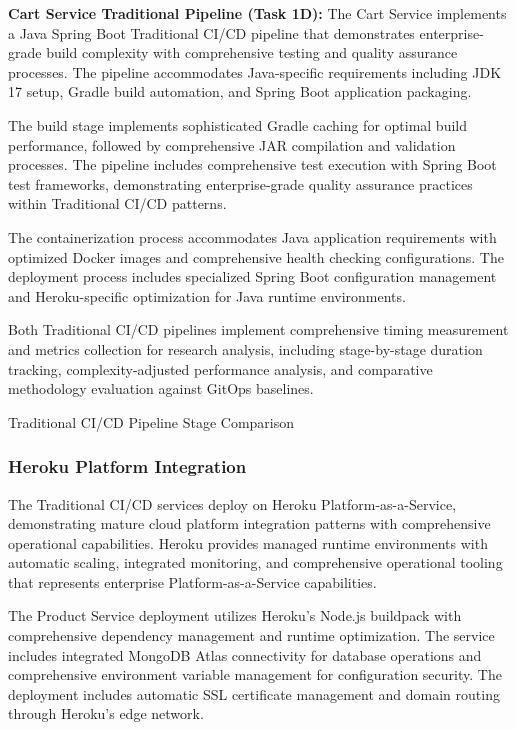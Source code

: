\textbf{Cart Service Traditional Pipeline (Task 1D):}
The Cart Service implements a Java Spring Boot Traditional CI/CD pipeline that demonstrates enterprise-grade build complexity with comprehensive testing and quality assurance processes. The pipeline accommodates Java-specific requirements including JDK 17 setup, Gradle build automation, and Spring Boot application packaging.

The build stage implements sophisticated Gradle caching for optimal build performance, followed by comprehensive JAR compilation and validation processes. The pipeline includes comprehensive test execution with Spring Boot test frameworks, demonstrating enterprise-grade quality assurance practices within Traditional CI/CD patterns.

The containerization process accommodates Java application requirements with optimized Docker images and comprehensive health checking configurations. The deployment process includes specialized Spring Boot configuration management and Heroku-specific optimization for Java runtime environments.

Both Traditional CI/CD pipelines implement comprehensive timing measurement and metrics collection for research analysis, including stage-by-stage duration tracking, complexity-adjusted performance analysis, and comparative methodology evaluation against GitOps baselines.

\begin{table}[H]
\centering
\caption{Traditional CI/CD Pipeline Stage Comparison}
\label{tab:traditional-pipeline-stages}
\end{table}

\subsubsection{Heroku Platform Integration}

The Traditional CI/CD services deploy on Heroku Platform-as-a-Service, demonstrating mature cloud platform integration patterns with comprehensive operational capabilities. Heroku provides managed runtime environments with automatic scaling, integrated monitoring, and comprehensive operational tooling that represents enterprise Platform-as-a-Service capabilities.

The Product Service deployment utilizes Heroku's Node.js buildpack with comprehensive dependency management and runtime optimization. The service includes integrated MongoDB Atlas connectivity for database operations and comprehensive environment variable management for configuration security. The deployment includes automatic SSL certificate management and domain routing through Heroku's edge network.

